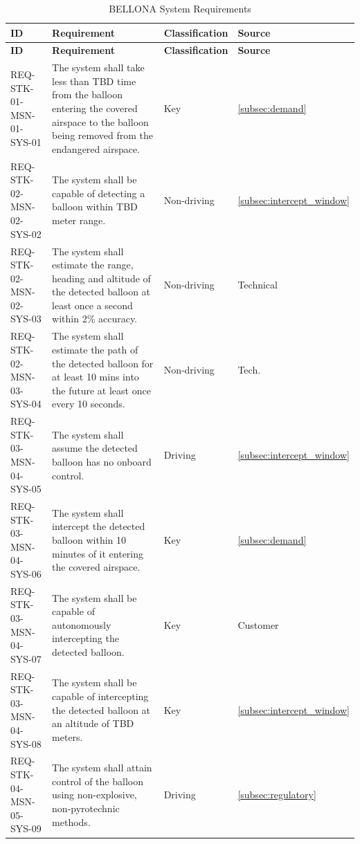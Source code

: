 \begin{xltabular}{\textwidth}{p{0.16\textwidth} p{0.5\textwidth} X p{0.1\textwidth}}
\caption{BELLONA System Requirements} \label{tab:system-requirements}\\
\hline
\textbf{ID} & \textbf{Requirement} & \textbf{Classification} & \textbf{Source} \\ \hline
\endfirsthead

\hline
\textbf{ID} & \textbf{Requirement} & \textbf{Classification} & \textbf{Source} \\ \hline
\endhead

\hline
\endfoot
%
REQ-STK-01-MSN-01-SYS-01 & The system shall take less than TBD time from the balloon entering the covered airspace to the balloon being removed from the endangered airspace. & Key &  \ref{subsec:demand}\\ 
REQ-STK-02-MSN-02-SYS-02 & The system shall be capable of detecting a balloon within TBD meter range. & Non-driving &  \ref{subsec:intercept_window}\\ 
REQ-STK-02-MSN-02-SYS-03 & The system shall estimate the range, heading and altitude of the detected balloon at least once a second within 2\% accuracy. & Non-driving &  Technical\\ 
REQ-STK-02-MSN-03-SYS-04 & The system shall estimate the path of the detected balloon for at least 10 mins into the future at least once every 10 seconds. & Non-driving &  Tech.\\ 
REQ-STK-03-MSN-04-SYS-05 & The system shall assume the detected balloon has no onboard control. & Driving &  \ref{subsec:intercept_window}\\ 
REQ-STK-03-MSN-04-SYS-06 & The system shall intercept the detected balloon within 10 minutes of it entering the covered airspace. & Key &  \ref{subsec:demand}\\ 
REQ-STK-03-MSN-04-SYS-07 & The system shall be capable of autonomously intercepting the detected balloon. & Key &  Customer\\ 
REQ-STK-03-MSN-04-SYS-08 & The system shall be capable of intercepting the detected balloon at an altitude of TBD meters. & Key &  \ref{subsec:intercept_window}\\ 
REQ-STK-04-MSN-05-SYS-09 & The system shall attain control of the balloon using non-explosive, non-pyrotechnic methods. & Driving &  \ref{subsec:regulatory}\\ 

\end{xltabular}
